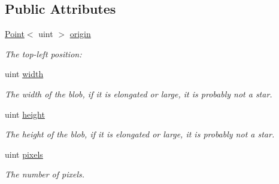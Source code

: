 \subsection*{Public Attributes}
\begin{DoxyCompactItemize}
\item 
\mbox{\label{classimage__processing_1_1Blob_ab42c355b4a3d7be3a9533fdffb21c593}} 
\hyperlink{classutil_1_1Point}{Point}$<$ uint $>$ \hyperlink{classimage__processing_1_1Blob_ab42c355b4a3d7be3a9533fdffb21c593}{origin}
\begin{DoxyCompactList}\small\item\em The top-\/left position\+: \end{DoxyCompactList}\item 
\mbox{\label{classimage__processing_1_1Blob_a11722fcf524938e1fcdff1f176bf19e3}} 
uint \hyperlink{classimage__processing_1_1Blob_a11722fcf524938e1fcdff1f176bf19e3}{width}
\begin{DoxyCompactList}\small\item\em The width of the blob, if it is elongated or large, it is probably not a star. \end{DoxyCompactList}\item 
\mbox{\label{classimage__processing_1_1Blob_a8b426974f1d12dce53d56cfb1efba84b}} 
uint \hyperlink{classimage__processing_1_1Blob_a8b426974f1d12dce53d56cfb1efba84b}{height}
\begin{DoxyCompactList}\small\item\em The height of the blob, if it is elongated or large, it is probably not a star. \end{DoxyCompactList}\item 
\mbox{\label{classimage__processing_1_1Blob_aec90a3f53aa18e2544d38732e8f9839f}} 
uint \hyperlink{classimage__processing_1_1Blob_aec90a3f53aa18e2544d38732e8f9839f}{pixels}
\begin{DoxyCompactList}\small\item\em The number of pixels. \end{DoxyCompactList}\item 
\mbox{\label{classimage__processing_1_1Blob_a9d69612e5931c12bbbfa25e44b626f5f}} 

\end{DoxyCompactItemize}

